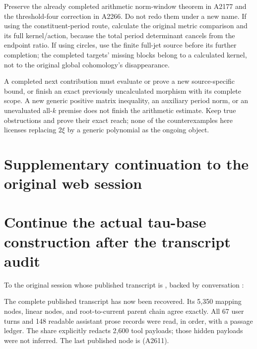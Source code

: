 Preserve the already completed arithmetic norm-window theorem in A2177
and the threshold-four correction in A2266. Do not redo them under a new
name. If using the constituent-period route, calculate the original
metric comparison and its full kernel/action, because the total period
determinant cancels from the endpoint ratio. If using circles, use the
finite full-jet source before its further completion; the completed
targets' missing blocks belong to a calculated kernel, not to the
original global cohomology's disappearance.

A completed next contribution must evaluate or prove a new
source-specific bound, or finish an exact previously uncalculated
morphism with its complete scope. A new generic positive matrix
inequality, an auxiliary period norm, or an unevaluated all-\(k\)
premise does not finish the arithmetic estimate. Keep true obstructions
and prove their exact reach; none of the counterexamples here licenses
replacing \(2\xi\) by a generic polynomial as the ongoing object.

\clearpage

\section{Supplementary continuation to the original web
session}\label{TranscriptLedgerStage:supplementary-continuation-to-the-original-web-session}

\section{Continue the actual tau-base construction after the transcript
audit}\label{TranscriptLedgerStage:continue-the-actual-tau-base-construction-after-the-transcript-audit}

To the original session whose published transcript is
\href{https://chatgpt.com/share/6aa6bc6e-98cc-83eb-9343-e811c26d6631}{\protect{}},
backed by conversation
\protect{}:

The complete published transcript has now been recovered. Its 5,350
mapping nodes, linear nodes, and root-to-current parent chain agree
exactly. All 67 user turns and 148 readable assistant prose records were
read, in order, with a passage ledger. The share explicitly redacts
2,600 tool payloads; those hidden payloads were not inferred. The last
published node is \protect{}
(A2611).

